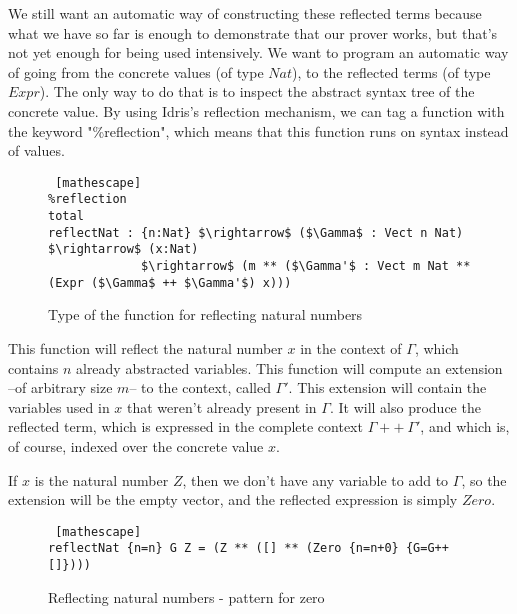 We still want an automatic way of constructing these reflected terms because what we have so far is enough to demonstrate that our prover works, but that's not yet enough for being used intensively. We want to program an automatic way of going from the concrete values (of type $Nat$), to the reflected terms (of type $Expr$). The only way to do that is to inspect the abstract syntax tree of the concrete value.
By using Idris's reflection mechanism, we can tag a function with the keyword "\%reflection", which means that this function runs on syntax instead of values. 

\begin{figure}[H]
\figrule
\begin{center}
\begin{lstlisting} [mathescape]
%reflection
total
reflectNat : {n:Nat} $\rightarrow$ ($\Gamma$ : Vect n Nat) $\rightarrow$ (x:Nat) 
             $\rightarrow$ (m ** ($\Gamma'$ : Vect m Nat ** (Expr ($\Gamma$ ++ $\Gamma'$) x)))
\end{lstlisting}
\end{center}
\caption{Type of the function for reflecting natural numbers}
\label{reflectNatType}
\figrule
\end{figure}

This function will reflect the natural number $x$ in the context of $\Gamma$, which contains $n$ already abstracted variables. This function will compute an extension --of arbitrary size $m$-- to the context, called $\Gamma'$. This extension will contain the variables used in $x$ that weren't already present in $\Gamma$. It will also produce the reflected term, which is expressed in the complete context $\Gamma ++\ \Gamma'$, and which is, of course, indexed over the concrete value $x$.

If $x$ is the natural number $Z$, then we don't have any variable to add to $\Gamma$, so the extension will be the empty vector, and the reflected expression is simply $Zero$.

 \begin{figure}[H]
\figrule
\begin{center}
\begin{lstlisting} [mathescape]
reflectNat {n=n} G Z = (Z ** ([] ** (Zero {n=n+0} {G=G++[]})))
\end{lstlisting}
\end{center}
\caption{Reflecting natural numbers - pattern for zero}
\label{reflectNat_pattern1}
\figrule
\end{figure}

